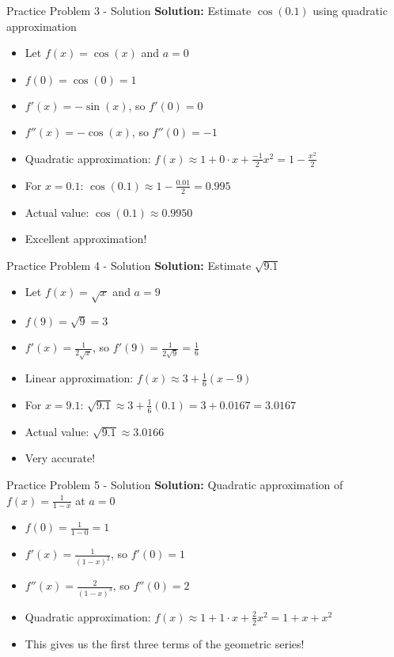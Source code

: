 \documentclass[aspectratio=169]{beamer}
\begin{document}
\begin{frame}{Practice Problem 3 - Solution}
\textbf{Solution:} Estimate $\cos(0.1)$ using quadratic approximation

\begin{itemize}
    \item Let $f(x) = \cos(x)$ and $a = 0$
    \item $f(0) = \cos(0) = 1$
    \item $f'(x) = -\sin(x)$, so $f'(0) = 0$
    \item $f''(x) = -\cos(x)$, so $f''(0) = -1$
    \item Quadratic approximation: $f(x) \approx 1 + 0 \cdot x + \frac{-1}{2}x^2 = 1 - \frac{x^2}{2}$
    \item For $x = 0.1$: $\cos(0.1) \approx 1 - \frac{0.01}{2} = 0.995$
    \item Actual value: $\cos(0.1) \approx 0.9950$
    \item Excellent approximation!
\end{itemize}
\end{frame}

\begin{frame}{Practice Problem 4 - Solution}
\textbf{Solution:} Estimate $\sqrt{9.1}$

\begin{itemize}
    \item Let $f(x) = \sqrt{x}$ and $a = 9$
    \item $f(9) = \sqrt{9} = 3$
    \item $f'(x) = \frac{1}{2\sqrt{x}}$, so $f'(9) = \frac{1}{2\sqrt{9}} = \frac{1}{6}$
    \item Linear approximation: $f(x) \approx 3 + \frac{1}{6}(x-9)$
    \item For $x = 9.1$: $\sqrt{9.1} \approx 3 + \frac{1}{6}(0.1) = 3 + 0.0167 = 3.0167$
    \item Actual value: $\sqrt{9.1} \approx 3.0166$
    \item Very accurate!
\end{itemize}
\end{frame}

\begin{frame}{Practice Problem 5 - Solution}
\textbf{Solution:} Quadratic approximation of $f(x) = \frac{1}{1-x}$ at $a = 0$

\begin{itemize}
    \item $f(0) = \frac{1}{1-0} = 1$
    \item $f'(x) = \frac{1}{(1-x)^2}$, so $f'(0) = 1$
    \item $f''(x) = \frac{2}{(1-x)^3}$, so $f''(0) = 2$
    \item Quadratic approximation: $f(x) \approx 1 + 1 \cdot x + \frac{2}{2}x^2 = 1 + x + x^2$
    \item This gives us the first three terms of the geometric series!
\end{itemize}
\end{frame}
\end{document}
